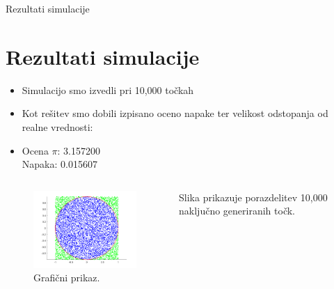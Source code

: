 \begin{frame}{Rezultati simulacije}
\section{Rezultati simulacije}
\begin{itemize}
    \item Simulacijo smo izvedli pri 10,000 točkah\\
    \item Kot rešitev smo dobili izpisano oceno napake ter velikost odstopanja od realne vrednosti:\\
    \item Ocena $\pi$: 3.157200 \\
          Napaka: 0.015607
\end{itemize}
\begin{columns}
    \begin{column}{0.6\textwidth} 


     \begin{figure}
    \centering
     \includegraphics[width=7cm]{rezultat.png}
     \vspace{-2em}
     \caption{Grafični prikaz.}
     \end{figure}

     
    \end{column}
    \begin{column}{0.4\textwidth} 
      Slika prikazuje porazdelitev 10,000 
      naključno generiranih točk.
    \end{column}
  \end{columns}


\end{frame}